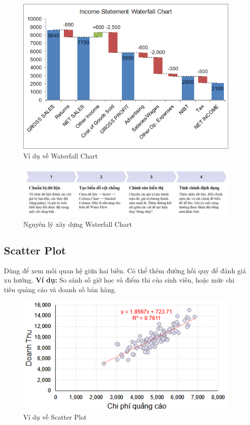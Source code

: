 \documentclass[11pt]{article}
\begin{document}
\begin{figure}[H]
    \centering
    \includegraphics[width=0.7\linewidth]{images/waterFlow.png}
    \caption{Ví dụ về Waterfall Chart}
    \label{fig:waterFlow}
\end{figure}

\begin{figure}[H]
    \centering
    \includegraphics[width=0.7\linewidth]{images/howTo_WaterFlow.png}
    \caption{Nguyên lý xây dựng Waterfall Chart}
    \label{fig:How 2 waterFlow}
\end{figure}

\subsection{Scatter Plot}
Dùng để xem mối quan hệ giữa hai biến. Có thể thêm đường hồi quy để đánh giá xu hướng.
\textbf{Ví dụ:} So sánh số giờ học và điểm thi của sinh viên, hoặc mức chi tiêu quảng cáo và doanh số bán hàng.

\begin{figure}[H]
    \centering
    \includegraphics[width=1\linewidth]{images/scatterPlot_4_CorrelationAnalysis.png}
    \caption{Ví dụ về Scatter Plot}
    \label{fig:chart_types}
\end{figure}
\end{document}
